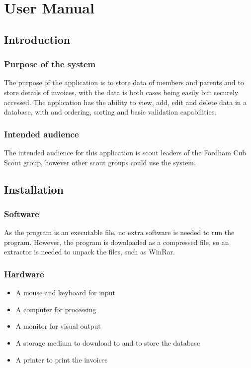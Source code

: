\chapter{User Manual}

\startcontents[manual]

\section{Introduction}
\subsection{Purpose of the system}
The purpose of the application is to store data of members and parents and to store details of invoices, with the data is both cases being easily but securely accessed. The application has the ability to view, add, edit and delete data in a database, with  and ordering, sorting and basic validation capabilities.

\subsection{Intended audience}
The intended audience for this application is scout leaders of the Fordham Cub Scout group, however other scout groups could use the system.

\section{Installation}

\subsection{Software}
As the program is an executable file, no extra software is needed to run the program. However, the program is downloaded as a compressed file, so an extractor is needed to unpack the files, such as WinRar.

\subsection{Hardware}
\begin{itemize}
	\item A mouse and keyboard for input
	\item A computer for processing
	\item A monitor for visual output
	\item A storage medium to download to and to store the database
	\item A printer to print the invoices
\end{itemize}

